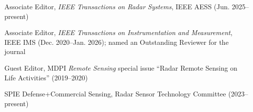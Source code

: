%
%
%
%



\begin{cvbullets}
    \item Associate Editor, \emph{IEEE Transactions on Radar Systems}, IEEE AESS (Jun. 2025--present)
    \item Associate Editor, \emph{IEEE Transactions on Instrumentation and Measurement}, IEEE IMS (Dec. 2020--Jan. 2026); named an Outstanding Reviewer for the journal
    \item Guest Editor, MDPI \emph{Remote Sensing} special issue ``Radar Remote Sensing on Life Activities'' (2019--2020)
\end{cvbullets}


\begin{cvbullets}
    \item SPIE Defense+Commercial Sensing, Radar Sensor Technology Committee (2023--present)
\end{cvbullets}


